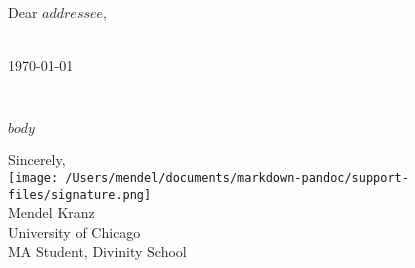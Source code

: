 \documentclass{letter}
\def\opening#1{\thispagestyle{empty}
{\centering\fromaddress \vspace{0.6in} \\ %
\today\hspace*{\fill}\par} %
{\raggedright \toname \\ \toaddress \par} %
\noindent #1 %
}
\begin{document}

\begin{letter}{Dear {$addressee$},}


\vspace{-5\parskip}\opening{}
 
$body$

\vspace{2\parskip} %


\closing{Sincerely,\\\texttt{[image: /Users/mendel/documents/markdown-pandoc/support-files/signature.png]}\\Mendel Kranz\\University of Chicago\\MA Student, Divinity School}





\end{letter}
 
\end{document}
